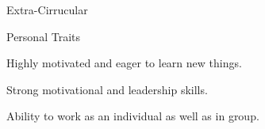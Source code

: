 \documentclass{resume} %
\begin{document}




%




\begin{rSection}{Extra-Cirrucular} \itemsep -3pt
    \item 


\end{rSection}

\begin{rSection}{Personal Traits}
\item Highly motivated and eager to learn new things.
\item Strong motivational and leadership skills.
\item Ability to work as an individual as well as in group.
\end{rSection}
\end{document}
